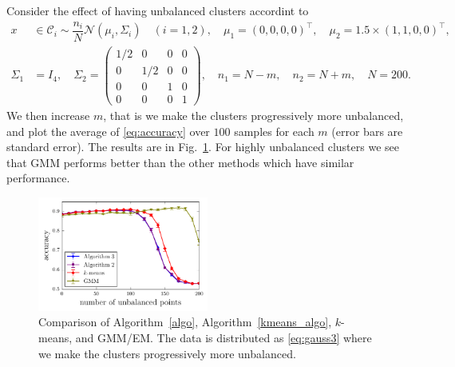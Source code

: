\documentclass[aps,preprint,nofootinbib,floatfix]{revtex4-1}
\newcommand\C{{\mathcal{C}}}
\begin{document}
Consider the effect of having 
unbalanced clusters accordint to
\begin{equation}
\label{eq:gauss3}
\begin{split}
x &\in \C_i \sim  
\dfrac{n_i}{N} \mathcal{N}(\mu_i,\Sigma_i) \quad (i=1,2), \quad 
\mu_1 = (0,0,0,0)^\top , \quad
\mu_2 = 1.5\times (1,1,0,0)^\top, \\
\Sigma_1 &= I_4, \quad
\Sigma_2 = \left( 
\begin{smallmatrix} 
1/2 & 0 & 0 & 0\\
0 & 1/2 & 0 & 0 \\
0 & 0 & 1 & 0 \\
0 & 0 & 0 & 1 
\end{smallmatrix}\right), \quad
n_1 = N - m, \quad  n_2 = N + m, \quad N=200.
\end{split}
\end{equation}
We then increase $m$, 
that is we make the clusters progressively more unbalanced,
and plot the average of \eqref{eq:accuracy} 
over
$100$ samples for each $m$
(error bars are standard error). The results are in Fig.~\ref{fig:unbalanced}.
For highly unbalanced clusters we see that GMM performs better than
the other methods which have similar performance.

\begin{figure}
\includegraphics[width=0.5\textwidth]{gauss_pi.pdf}\vspace{-1em}
\caption{
\label{fig:unbalanced}
Comparison of Algorithm~\ref{algo}, Algorithm~\ref{kmeans_algo}, 
$k$-means, and GMM/EM. The data is distributed as \eqref{eq:gauss3} where
we make the clusters progressively more unbalanced.
}
\end{figure}
\end{document}
